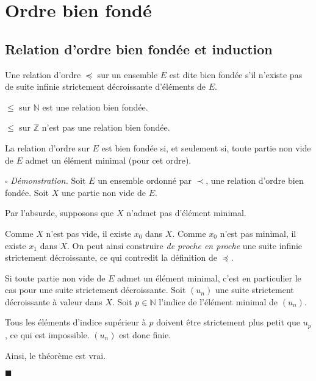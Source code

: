 \documentclass[a4paper, titlepage]{article}
\renewenvironment{proof}{\par$\square$ \footnotesize\textit{Démonstration.}}{\begin{flushright}$\blacksquare$\end{flushright}\par}
\begin{document}
    \section{Ordre bien fondé}
    \subsection{Relation d'ordre bien fondée et induction}
    \begin{defn}
        Une relation d'ordre $\preceq$ sur un ensemble $E$ est dite bien fondée s'il n'existe pas de suite infinie
        strictement décroissante d'éléments de $E$.
    \end{defn}
    \begin{exemple}
        $\leqslant$ sur $\mathbb{N}$ est une relation bien fondée.
        
        $\leqslant$ sur $\mathbb{Z}$ n'est pas une relation bien fondée.
    \end{exemple}
    \begin{thm}
        La relation d'ordre sur $E$ est bien fondée si, et seulement si, toute partie non vide de $E$ admet un élément
        minimal (pour cet ordre).
    \end{thm}
    \begin{proof}
        Soit $E$ un ensemble ordonné par $\prec$, une relation d'ordre bien fondée.
        Soit $X$ une partie non vide de $E$.

        \fbox{$\implies$}
        Par l'absurde, supposons que $X$ n'admet pas d'élément minimal.

        Comme $X$ n'est pas vide, il existe $x_0$ dans $X$.
        Comme $x_0$ n'est pas minimal, il existe $x_1$ dans $X$.
        On peut ainsi construire \textit{de proche en proche} une suite infinie strictement décroissante, ce qui
        contredit la définition de $\preceq$.

        \fbox{$\impliedby$}
        Si toute partie non vide de $E$ admet un élément minimal, c'est en particulier le cas pour une suite 
        strictement décroissante.
        Soit $(u_n)$ une suite strictement décroissante à valeur dans $X$.
        Soit $p\in\mathbb{N}$ l'indice de l'élément minimal de $(u_n)$.
        
        Tous les éléments d'indice supérieur à $p$ doivent être strictement plus petit que $u_p$, ce qui est impossible.
        $(u_n)$ est donc finie.

        Ainsi, le théorème est vrai.
    \end{proof}
\end{document}
